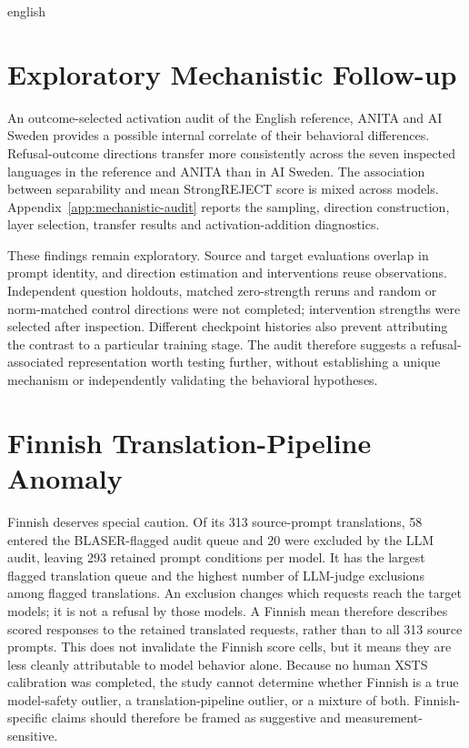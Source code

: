 \begin{otherlanguage*}{english}
\section{Exploratory Mechanistic Follow-up}
An outcome-selected activation audit of the English reference, ANITA and AI Sweden provides a possible internal correlate of their behavioral differences. Refusal-outcome directions transfer more consistently across the seven inspected languages in the reference and ANITA than in AI Sweden. The association between separability and mean StrongREJECT score is mixed across models. Appendix~\ref{app:mechanistic-audit} reports the sampling, direction construction, layer selection, transfer results and activation-addition diagnostics.

These findings remain exploratory. Source and target evaluations overlap in prompt identity, and direction estimation and interventions reuse observations. Independent question holdouts, matched zero-strength reruns and random or norm-matched control directions were not completed; intervention strengths were selected after inspection. Different checkpoint histories also prevent attributing the contrast to a particular training stage. The audit therefore suggests a refusal-associated representation worth testing further, without establishing a unique mechanism or independently validating the behavioral hypotheses.

\section{Finnish Translation-Pipeline Anomaly}
\label{sec:finnish-investigation}

Finnish deserves special caution. Of its 313 source-prompt translations, 58 entered the BLASER-flagged audit queue and 20 were excluded by the LLM audit, leaving 293 retained prompt conditions per model. It has the largest flagged translation queue and the highest number of LLM-judge exclusions among flagged translations. An exclusion changes which requests reach the target models; it is not a refusal by those models. A Finnish mean therefore describes scored responses to the retained translated requests, rather than to all 313 source prompts. This does not invalidate the Finnish score cells, but it means they are less cleanly attributable to model behavior alone. Because no human XSTS calibration was completed, the study cannot determine whether Finnish is a true model-safety outlier, a translation-pipeline outlier, or a mixture of both. Finnish-specific claims should therefore be framed as suggestive and measurement-sensitive.


\end{otherlanguage*}
